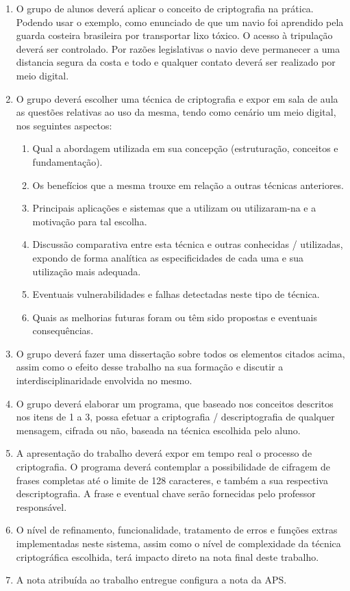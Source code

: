 \documentclass[12pt]{article}
\begin{document}
\begin{enumerate}


\item O grupo de alunos deverá aplicar o conceito de criptografia na prática.
Podendo usar o exemplo, como enunciado de que um navio foi aprendido
pela guarda costeira brasileira
por transportar lixo tóxico.
O acesso à tripulação deverá ser controlado.
Por razões legislativas o navio deve permanecer a uma distancia segura da costa
e todo e qualquer contato deverá ser realizado por meio digital.

\item  O grupo deverá escolher uma técnica de criptografia e expor em sala de aula
as questões relativas ao uso da mesma, tendo como cenário um meio digital,
nos seguintes aspectos:
\begin{enumerate}
\item Qual a abordagem utilizada em sua concepção (estruturação,
conceitos e fundamentação).
\item Os benefícios que a mesma trouxe em relação a outras técnicas
anteriores.
\item Principais aplicações e sistemas que a utilizam ou utilizaram-na e a
motivação para tal escolha.

\item Discussão comparativa entre esta técnica e outras conhecidas /
utilizadas, expondo de forma analítica as especificidades de cada uma
e sua utilização mais adequada.
\item Eventuais vulnerabilidades e falhas detectadas neste tipo de técnica.
\item Quais as melhorias futuras foram ou têm sido propostas e eventuais
consequências.
\end{enumerate}


\item O grupo deverá fazer uma dissertação sobre todos os elementos citados
acima, assim como o efeito desse trabalho na sua formação e discutir a
interdisciplinaridade envolvida no mesmo.
\item O grupo deverá elaborar um programa, que baseado nos conceitos descritos
nos itens de 1 a 3, possa efetuar a criptografia / descriptografia de qualquer
mensagem, cifrada ou não, baseada na técnica escolhida pelo aluno.
\item A apresentação do trabalho deverá expor em tempo real o processo de
criptografia. O programa deverá contemplar a possibilidade de cifragem de
frases completas até o limite de 128 caracteres, e também a sua respectiva
descriptografia. A frase e eventual chave serão fornecidas pelo professor
responsável.
\item O nível de refinamento, funcionalidade, tratamento de erros e funções extras
implementadas neste sistema, assim como o nível de complexidade da
técnica criptográfica escolhida, terá impacto direto na nota final deste
trabalho.
\item A nota atribuída ao trabalho entregue configura a nota da APS.

\end{enumerate}
\end{document}
